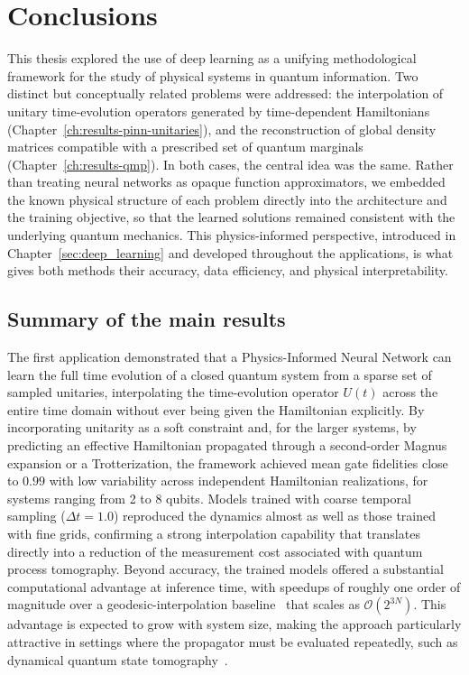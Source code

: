 \chapter{Conclusions}
\label{sec:conclusions}

This thesis explored the use of deep learning as a unifying methodological framework for the study of physical systems in quantum information. Two distinct but conceptually related problems were addressed: the interpolation of unitary time-evolution operators generated by time-dependent Hamiltonians (Chapter~\ref{ch:results-pinn-unitaries}), and the reconstruction of global density matrices compatible with a prescribed set of quantum marginals (Chapter~\ref{ch:results-qmp}). In both cases, the central idea was the same. Rather than treating neural networks as opaque function approximators, we embedded the known physical structure of each problem directly into the architecture and the training objective, so that the learned solutions remained consistent with the underlying quantum mechanics. This physics-informed perspective, introduced in Chapter~\ref{sec:deep_learning} and developed throughout the applications, is what gives both methods their accuracy, data efficiency, and physical interpretability.

\section{Summary of the main results}
\label{sec:conc-summary}

The first application demonstrated that a Physics-Informed Neural Network can learn the full time evolution of a closed quantum system from a sparse set of sampled unitaries, interpolating the time-evolution operator $U(t)$ across the entire time domain without ever being given the Hamiltonian explicitly. By incorporating unitarity as a soft constraint and, for the larger systems, by predicting an effective Hamiltonian propagated through a second-order Magnus expansion or a Trotterization, the framework achieved mean gate fidelities close to $0.99$ with low variability across independent Hamiltonian realizations, for systems ranging from 2 to 8 qubits. Models trained with coarse temporal sampling ($\Delta t = 1.0$) reproduced the dynamics almost as well as those trained with fine grids, confirming a strong interpolation capability that translates directly into a reduction of the measurement cost associated with quantum process tomography. Beyond accuracy, the trained models offered a substantial computational advantage at inference time, with speedups of roughly one order of magnitude over a geodesic-interpolation baseline~\cite{schilling2024} that scales as $\mathcal{O}(2^{3N})$. This advantage is expected to grow with system size, making the approach particularly attractive in settings where the propagator must be evaluated repeatedly, such as dynamical quantum state tomography~\cite{Siva2022, peruzzo2026}.

